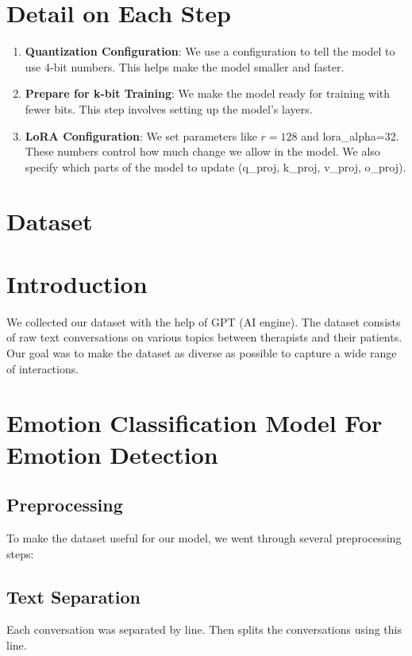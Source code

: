 \section{Detail on Each Step}
\begin{enumerate}
    \item \textbf{Quantization Configuration}: We use a configuration to tell the model to use 4-bit numbers. This helps make the model smaller and faster.
    \item \textbf{Prepare for k-bit Training}: We make the model ready for training with fewer bits. This step involves setting up the model’s layers.
    \item \textbf{LoRA Configuration}: We set parameters like \( r=128 \) and {lora\_alpha=32}. These numbers control how much change we allow in the model. We also specify which parts of the model to update (q\_proj, k\_proj, v\_proj, o\_proj).
\end{enumerate}

\section{Dataset}

\section{Introduction}
We collected our dataset with the help of GPT (AI engine). The dataset consists of raw text conversations on various topics between therapists and their patients. Our goal was to make the dataset as diverse as possible to capture a wide range of interactions.



\section{Emotion Classification Model For Emotion Detection}

\subsection{Preprocessing}
To make the dataset useful for our model, we went through several preprocessing steps:

\subsection{Text Separation}
Each conversation was separated by line. Then splits the conversations using this line.


